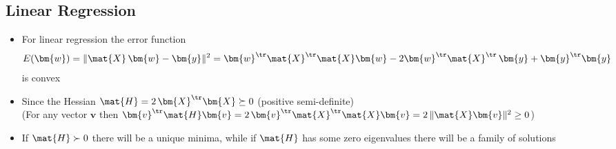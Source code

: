 
\begin{slide}
\section{Linear Regression}

\begin{PauseHighLight}
  \begin{itemize}
  \item For linear regression the error function
    \begin{align*}
      E(\bm{w}) = \| \mat{X}\, \bm{w} - \bm{y} \|^2 = \bm{w}^\tr
      \mat{X}^\tr\mat{X} \bm{w} - 2 \bm{w}^\tr \mat{X}^\tr\, \bm{y} +
      \bm{y}^\tr \bm{y}
    \end{align*}
    is convex\pause
  \item Since the Hessian $\mat{H} = 2\,\bm{X}^\tr \bm{X} \succeq 0$
    (positive semi-definite)\pause\\
    (For any vector $\bm{v}$ then $\bm{v}^\tr \mat{H} \bm{v} =
    2\,\bm{v}^\tr\mat{X}^\tr \mat{X}\bm{v} = 2\,\| \mat{X}\bm{v} \|^2 \geq 0$)\pauseb
  \item If $\mat{H}\succ 0$ there will be a unique minima\pause, while
    if $\mat{H}$ has some zero eigenvalues there will be a family of
    solutions\pauseb
  \end{itemize}
\end{PauseHighLight}

\end{slide}


